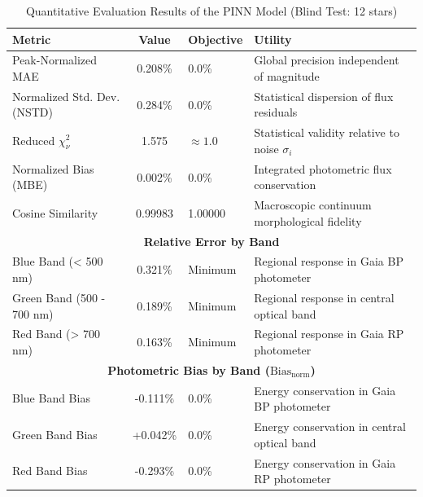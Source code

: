 
\begin{table}[htpb]
\centering
\caption{Quantitative Evaluation Results of the PINN Model (Blind Test: 12 stars)}
\label{tab:pinn_evaluation}
\begin{tabular}{lcll}
\hline
\textbf{Metric} & \textbf{Value} & \textbf{Objective} & \textbf{Utility} \\
\hline
Peak-Normalized MAE & 0.208\% & 0.0\% & Global precision independent of magnitude \\
Normalized Std. Dev. (NSTD) & 0.284\% & 0.0\% & Statistical dispersion of flux residuals \\
Reduced $\chi^2_\nu$ & 1.575 & $\approx 1.0$ & Statistical validity relative to noise $\sigma_i$ \\
Normalized Bias (MBE) & 0.002\% & 0.0\% & Integrated photometric flux conservation \\
Cosine Similarity & 0.99983 & 1.00000 & Macroscopic continuum morphological fidelity \\
\hline
\multicolumn{4}{c}{\textbf{Relative Error by Band}} \\
\hline
Blue Band (< 500 nm) & 0.321\% & Minimum & Regional response in Gaia BP photometer \\
Green Band (500 - 700 nm) & 0.189\% & Minimum & Regional response in central optical band \\
Red Band (> 700 nm) & 0.163\% & Minimum & Regional response in Gaia RP photometer \\
\hline
\multicolumn{4}{c}{\textbf{Photometric Bias by Band ($\text{Bias}_{\text{norm}}$)}} \\
\hline
Blue Band Bias & -0.111\% & 0.0\% & Energy conservation in Gaia BP photometer \\
Green Band Bias & +0.042\% & 0.0\% & Energy conservation in central optical band \\
Red Band Bias & -0.293\% & 0.0\% & Energy conservation in Gaia RP photometer \\
\hline
\end{tabular}
\end{table}
